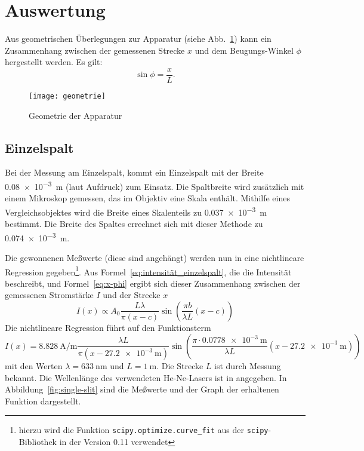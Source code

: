 
\section{Auswertung}


Aus geometrischen Überlegungen zur Apparatur (siehe 
Abb.~\ref{fig:apparatur-geometrie}) kann ein Zusammenhang zwischen der
gemessenen Strecke $x$ und dem Beugungs-Winkel $\phi$ hergestellt
werden. Es gilt:
%
\begin{equation}
  \label{eq:x-phi}
  \sin\phi = \frac{x}{L}\text{.}
\end{equation}

\begin{figure}[b]
  \centering
  \texttt{[image: geometrie]}
  \caption{Geometrie der Apparatur}
  \label{fig:apparatur-geometrie}
\end{figure}

\subsection{Einzelspalt}

Bei der Messung am Einzelspalt, kommt ein Einzelspalt mit der Breite
\SI{0.08e-3}{\metre} (laut Aufdruck) zum Einsatz. Die Spaltbreite wird
zusätzlich mit einem Mikroskop gemessen, das im Objektiv eine Skala
enthält. Mithilfe eines Vergleichsobjektes wird die Breite eines
Skalenteils zu \SI{0.037e-3}{\metre} bestimmt. Die Breite des Spaltes
errechnet sich mit dieser Methode zu \SI{0.074e-3}{\metre}. 

Die gewonnenen Meßwerte (diese sind angehängt) werden nun in eine
nichtlineare Regression gegeben\footnote{hierzu wird die Funktion
  \texttt{scipy.optimize.curve\_fit} aus der \texttt{scipy}-Bibliothek
  in der Version 0.11 verwendet}. Aus
Formel~\eqref{eq:intensität_einzelspalt}, die die Intensität beschreibt,
und Formel~\eqref{eq:x-phi} ergibt sich dieser Zusammenhang zwischen der
gemessenen Stromstärke $I$ und der Strecke $x$
%
\begin{equation}
  \label{eq:strom-einzelspalt}
  I(x) \propto A_0\frac{L\lambda}{\pi(x-c)} \sin\left(\frac{\pi b}{\lambda
        L} (x-c)\right)
\end{equation}
%
Die nichtlineare Regression führt auf den Funktionsterm
%
\begin{equation}
  \label{eq:single-slit-fit}
  I(x) = \SI{8.828}{\ampere\per\metre}
  \frac{\lambda L}{\pi(x-\SI{27.2e-3}{\metre})}
  \sin\left(\frac{\pi\cdot\SI{0.0778e-3}{\metre}}{\lambda L} 
    (x-\SI{27.2e-3}{\metre})\right)
\end{equation}
%
mit den Werten $\lambda = \SI{633}{\nano\metre}$ und $L =
\SI{1}{\metre}$. Die Strecke $L$ ist durch Messung bekannt. Die
Wellenlänge des verwendeten He-Ne-Lasers ist in \textcite[36]{v406}
angegeben. In Abbildung~\ref{fig:single-slit} sind die Meßwerte und der
Graph der erhaltenen Funktion dargestellt.

